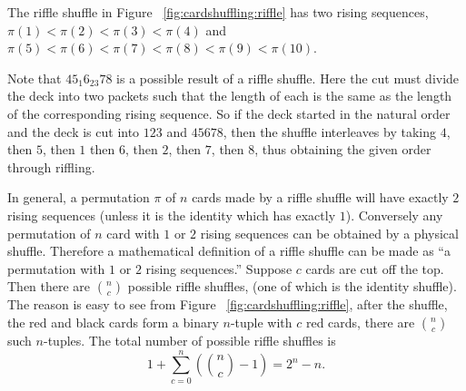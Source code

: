 \documentclass[12pt]{article}
\begin{document}
\begin{example}
    The riffle shuffle in Figure~%
    \ref{fig:cardshuffling:riffle} has two rising sequences, \( \pi(1) <
    \pi(2) < \pi(3) < \pi(4) \) and \( \pi(5) < \pi(6) < \pi(7) < \pi(8)
    < \pi(9) < \pi(10) \).
\end{example}

\begin{example}
    Note that \( 45_{1}6_{23}78 \) is a possible result of a riffle
    shuffle. Here the cut must divide the deck into two packets such
    that the length of each is the same as the length of the
    corresponding rising sequence.  So if the deck started in the
    natural order and the deck is cut into \( 123 \) and \( 45678 \),
    then the shuffle interleaves by taking \( 4 \), then \( 5 \), then \(
    1 \) then \( 6 \), then \( 2 \), then \( 7 \), then \( 8 \), thus
    obtaining the given order through riffling.
\end{example}

In general, a permutation \( \pi \) of \( n \) cards made by a riffle
shuffle will have exactly \( 2 \) rising sequences (unless it is the
identity which has exactly \( 1 \)).  Conversely any permutation of \( n
\) card with \( 1 \) or \( 2 \) rising sequences can be obtained by a
physical shuffle. Therefore a mathematical definition of a riffle
shuffle can be made as ``a permutation with \( 1 \) or \( 2 \) rising
sequences.'' Suppose \( c \) cards are cut off the top.  Then there are \(
\binom{n}{c} \) possible riffle shuffles, (one of which is the identity
shuffle).  The reason is easy to see from Figure~%
\ref{fig:cardshuffling:riffle}, after the shuffle, the red and black
cards form a binary \( n \)-tuple with \( c \) red cards, there are \(
\binom{n}{c} \) such \( n \)-tuples.  The total number of possible
riffle shuffles is
\[
    1 + \sum\limits_{c=0}^n \left( \binom{n}{c} - 1\right) = 2^n - n.
\]
\end{document}
